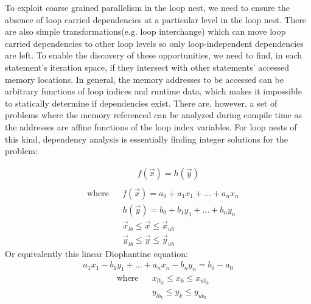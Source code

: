 To exploit coarse grained parallelism in the loop nest, we need to ensure the
absence of loop carried dependencies at a particular level in the loop nest. There are also simple transformations(e.g. loop interchange) which can move loop carried
dependencies to other loop levels so only loop-independent dependencies are left. To enable the discovery of these opportunities, we need to find, in each statement's iteration space, if they intersect with other statements' accessed memory locations. In general, the memory addresses to be accessed can be arbitrary functions of loop indices and runtime data, which makes it impossible to statically determine if
dependencies exist. There are, however, a  set of problems where
the memory referenced can be analyzed during compile time as the addresses are affine functions of the loop index variables. For loop nests of this kind,
dependency analysis is essentially finding integer solutions for the problem:

\begin{equation}
\begin{aligned}
\label{dioeq}
& \text{} & & f(\vec{x}) = h(\vec{y}) \\
\end{aligned}
\end{equation}
\begin{equation*}
\begin{aligned}
& \text{ where}  & & f(\vec{x}) = a_0 + a_1x_1+...+a_nx_n \\
& & & h(\vec{y}) = b_0 + b_1y_1+...+b_ny_n \\
& & & \vec{x}_{lb} \le \vec{x} \le \vec{x}_{ub} \\
& & & \vec{y}_{lb} \le \vec{y} \le \vec{y}_{ub}
\end{aligned}
\end{equation*}
Or equivalently this linear Diophantine equation:
\begin{equation}
\begin{aligned}
\label{adioeq}
a_1x_1-b_1y_1+...+a_nx_n-b_ny_n = b_0 - a_0
\end{aligned}
\end{equation}
\begin{equation*}
\begin{aligned}
& \text{ where}  & & x_{lb_k} \le x_k \le x_{ub_k} \\
& & & y_{lb_k} \le y_k \le y_{ub_k} \\
\end{aligned}
\end{equation*}

